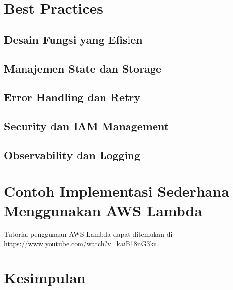 \section{Best Practices}
\subsection{Desain Fungsi yang Efisien}
\subsection{Manajemen State dan Storage}
\subsection{Error Handling dan Retry}
\subsection{Security dan IAM Management}
\subsection{Observability dan Logging}

\section{Contoh Implementasi Sederhana Menggunakan AWS Lambda}

Tutorial penggunaan AWS Lambda dapat ditemukan di \url{https://www.youtube.com/watch?v=kaiB18nG3kc}.


\section{Kesimpulan}
